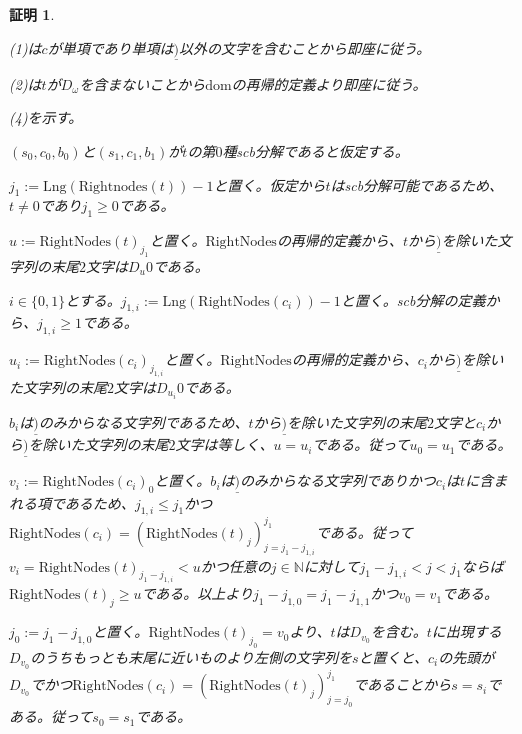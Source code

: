 \documentclass[dvipdfmx,uplatex]{jsarticle}
\theoremstyle{customnonumberbreakfortheorem}
\theoremstyle{customnonumberbreakforproof}
\newtheorem{hideableproof}{証明}
\begin{document}
\begin{hideableproof}
	\begin{indented}
		\item (1)は\(c\)が単項であり単項は\(\underline{)}\)以外の文字を含むことから即座に従う。
		\item (2)は\(t\)が\(D_{\omega}\)を含まないことから\(\textrm{dom}\)の再帰的定義より即座に従う。
		\item (4)を示す。
		\begin{indented}
			\item \((s_0,c_0,b_0)\)と\((s_1,c_1,b_1)\)が\(t\)の第\(0\)種scb分解であると仮定する。
			\item \(j_1 := \textrm{Lng}(\textrm{Rightnodes}(t))-1\)と置く。仮定から\(t\)はscb分解可能であるため、\(t \neq 0\)であり\(j_1 \geq 0\)である。
			\item \(u := \textrm{RightNodes}(t)_{j_1}\)と置く。\(\textrm{RightNodes}\)の再帰的定義から、\(t\)から\(\underline{)}\)を除いた文字列の末尾\(2\)文字は\(D_u 0\)である。
			\item \(i \in \{0,1\}\)とする。\(j_{1,i} := \textrm{Lng}(\textrm{RightNodes}(c_i))-1\)と置く。scb分解の定義から、\(j_{1,i} \geq 1\)である。
			\item \(u_i := \textrm{RightNodes}(c_i)_{j_{1,i}}\)と置く。\(\textrm{RightNodes}\)の再帰的定義から、\(c_i\)から\(\underline{)}\)を除いた文字列の末尾\(2\)文字は\(D_{u_i} 0\)である。
			\item \(b_i\)は\(\underline{)}\)のみからなる文字列であるため、\(t\)から\(\underline{)}\)を除いた文字列の末尾\(2\)文字と\(c_i\)から\(\underline{)}\)を除いた文字列の末尾\(2\)文字は等しく、\(u = u_i\)である。従って\(u_0 = u_1\)である。
			\item \(v_i := \textrm{RightNodes}(c_i)_0\)と置く。\(b_i\)は\(\underline{)}\)のみからなる文字列でありかつ\(c_i\)は\(t\)に含まれる項であるため、\(j_{1,i} \leq j_1\)かつ\(\textrm{RightNodes}(c_i) = (\textrm{RightNodes}(t)_j)_{j=j_1-j_{1,i}}^{j_1}\)である。従って\(v_i = \textrm{RightNodes}(t)_{j_1-j_{1,i}} < u\)かつ任意の\(j \in \mathbb{N}\)に対して\(j_1-j_{1,i} < j < j_1\)ならば\(\textrm{RightNodes}(t)_j \geq u\)である。以上より\(j_1-j_{1,0} = j_1-j_{1,1}\)かつ\(v_0 = v_1\)である。
			\item \(j_0 := j_1 - j_{1,0}\)と置く。\(\textrm{RightNodes}(t)_{j_0} = v_0\)より、\(t\)は\(D_{v_0}\)を含む。\(t\)に出現する\(D_{v_0}\)のうちもっとも末尾に近いものより左側の文字列を\(s\)と置くと、\(c_i\)の先頭が\(D_{v_0}\)でかつ\(\textrm{RightNodes}(c_i) = (\textrm{RightNodes}(t)_j)_{j=j_0}^{j_1}\)であることから\(s = s_i\)である。従って\(s_0 = s_1\)である。

\end{indented}
\end{indented}
\end{hideableproof}
\end{document}
